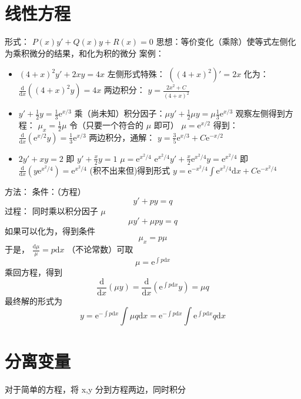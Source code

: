 \documentclass[11pt]{report}
\begin{document}
\section{线性方程}
\label{sec:orgb91fd6f}
形式： \(P(x)y'+Q(x)y+R(x)=0\)
思想：等价变化（乘除）使等式左侧化为乘积微分的结果，和化为积的微分
案例：
\begin{itemize}
\item \((4+x)^2y'+2xy=4x\)
左侧形式特殊： \(((4+x)^2)'=2x\)
化为： \(\frac{\mathrm{d}}{\mathrm{d}x}((4+x)^2y)=4x\)
两边积分： \(y=\frac{2x^2+C}{(4+x)^2}\)
\item \(y'+\frac{1}{2}y=\frac{1}{3}\mathrm{e}^{x/3}\)
乘（尚未知）积分因子：\(\mu y' +\frac{1}{2}\mu y=\mu\frac{1}{3}\mathrm{e}^{x/3}\)
观察左侧得到方程： \(\mu_x=\frac{1}{2}\mu\)
令（只要一个符合的 \(\mu\) 即可） \(\mu=\mathrm{e}^{x/2}\)
得到： \(\frac{\mathrm{d}}{\mathrm{d}x}(\mathrm{e}^{x/2}y)=\frac{1}{3}\mathrm{e}^{x/3}\)
两边积分，通解： \(y=\frac{3}{5}\mathrm{e}^{x/3}+C\mathrm{e}^{-x/2}\)
\item \(2y'+xy=2\)
即 \(y'+\frac{x}{2}y=1\)
\(\mu=\mathrm{e}^{x^2/4}\)
\(\mathrm{e}^{x^2/4}y'+\frac{x}{2}\mathrm{e}^{x^2/4}y=\mathrm{e}^{x^2/4}\) 即 \(\frac{\mathrm{d}}{\mathrm{d}x}(y\mathrm{e}^{x^2/4})=\mathrm{e}^{x^2/4}\)
(积不出来但)得到形式 \(y=\mathrm{e}^{-x^2/4}\int \mathrm{e}^{x^2/4}\mathrm{d}x +C\mathrm{e}^{-x^2/4}\)
\end{itemize}
方法：
条件：（方程）
$$y'+py=q$$
过程：
同时乘以积分因子 \(\mu\)
$$\mu y'+\mu py=q$$
如果可以化为，得到条件
\begin{equation}
\label{eq:32}
\mu_x=p\mu
\end{equation}
于是， \(\frac{\mathrm{d}\mu}{\mu}=p\mathrm{d}x\)
（不论常数）可取
\begin{equation}
\label{eq:33}
\mu=\mathrm{e}^{\int p \mathrm{d}x}
\end{equation}
乘回方程，得到
\begin{equation}
\label{eq:34}
\frac{\mathrm{d}}{\mathrm{d}x}(\mu y)=\frac{\mathrm{d}}{\mathrm{d}x}(\mathrm{e}^{\int p \mathrm{d}x}y)=\mu q
\end{equation}
最终解的形式为
\begin{equation}
\label{eq:35}
y=\mathrm{e}^{-\int p\mathrm{d}x}\int \mu q\mathrm{d}x=\mathrm{e}^{-\int p\mathrm{d}x}\int \mathrm{e}^{\int p \mathrm{d}x} q\mathrm{d}x
\end{equation}

\section{分离变量}
\label{sec:orgebba323}
对于简单的方程，将 x,y 分到方程两边，同时积分
\end{document}
